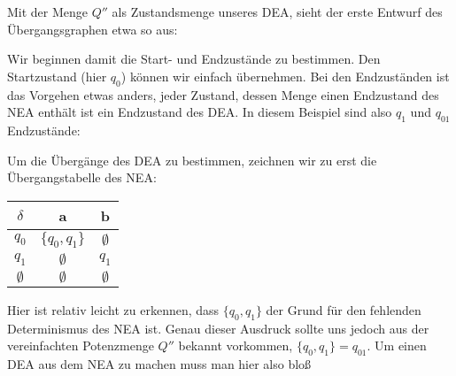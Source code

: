 \begin{flushleft}
    Mit der Menge $Q''$ als Zustandsmenge unseres DEA, sieht der erste Entwurf des Übergangsgraphen etwa so aus:
    \begin{center}
    \end{center}
    Wir beginnen damit die Start- und Endzustände zu bestimmen. Den Startzustand (hier $q_0$) können 
    wir einfach übernehmen. Bei den Endzuständen ist das Vorgehen etwas anders, jeder Zustand, dessen Menge 
    einen Endzustand des NEA enthält ist ein Endzustand des DEA. In diesem Beispiel sind also $q_1$ und $q_{01}$
    Endzustände:
    \begin{center}
    \end{center}
    Um die Übergänge des DEA zu bestimmen, zeichnen wir zu erst die Übergangstabelle des NEA:
    \begin{center}
        \begin{tabular}{|c|c|c|}
            \hline
            $\delta$ & a & b \\
            \hline
            $q_0$ & $\{q_0,q_1\}$ & $\emptyset$ \\
            \hline
            $q_1$ & $\emptyset$ & $q_1$ \\
            \hline
            $\emptyset$ & $\emptyset$ & $\emptyset$ \\
            \hline
        \end{tabular}
    \end{center}
    Hier ist relativ leicht zu erkennen, dass $\{q_0,q_1\}$ der Grund für den fehlenden 
    Determinismus des NEA ist. Genau dieser Ausdruck sollte uns jedoch aus der vereinfachten Potenzmenge 
    $Q''$ bekannt vorkommen, $\{q_0,q_1\}=q_{01}$. Um einen DEA aus dem NEA zu machen muss man hier also bloß 

\end{flushleft}
